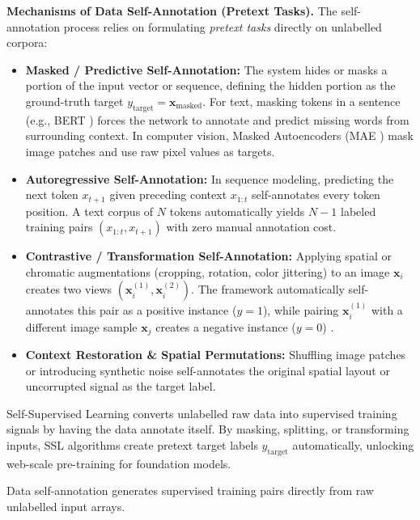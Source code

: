 \documentclass[11pt,a4paper]{article}
\begin{document}
	\textbf{Mechanisms of Data Self-Annotation (Pretext Tasks).} The self-annotation process relies on formulating \emph{pretext tasks} directly on unlabelled corpora:
	\begin{itemize}[nosep]
		\item \textbf{Masked / Predictive Self-Annotation:} The system hides or masks a portion of the input vector or sequence, defining the hidden portion as the ground-truth target $y_{\text{target}} = \mathbf{x}_{\text{masked}}$. For text, masking tokens in a sentence (e.g., BERT \parencite{devlin2019}) forces the network to annotate and predict missing words from surrounding context. In computer vision, Masked Autoencoders (MAE \parencite{he2022}) mask image patches and use raw pixel values as targets.
		\item \textbf{Autoregressive Self-Annotation:} In sequence modeling, predicting the next token $x_{t+1}$ given preceding context $x_{1:t}$ self-annotates every token position. A text corpus of $N$ tokens automatically yields $N-1$ labeled training pairs $(x_{1:t}, x_{t+1})$ with zero manual annotation cost.
		\item \textbf{Contrastive / Transformation Self-Annotation:} Applying spatial or chromatic augmentations (cropping, rotation, color jittering) to an image $\mathbf{x}_i$ creates two views $(\mathbf{x}_i^{(1)}, \mathbf{x}_i^{(2)})$. The framework automatically self-annotates this pair as a positive instance ($y = 1$), while pairing $\mathbf{x}_i^{(1)}$ with a different image sample $\mathbf{x}_j$ creates a negative instance ($y = 0$) \parencite{chen2020}.
		\item \textbf{Context Restoration \& Spatial Permutations:} Shuffling image patches or introducing synthetic noise self-annotates the original spatial layout or uncorrupted signal as the target label.
	\end{itemize}
	
	\begin{keyconcept}
		Self-Supervised Learning converts unlabelled raw data into supervised training signals by having the data annotate itself. By masking, splitting, or transforming inputs, SSL algorithms create pretext target labels $y_{\text{target}}$ automatically, unlocking web-scale pre-training for foundation models.
	\end{keyconcept}
	
	\begin{practicebox}

		Data self-annotation generates supervised training pairs directly from raw unlabelled input arrays.
	\end{practicebox}
\end{document}
